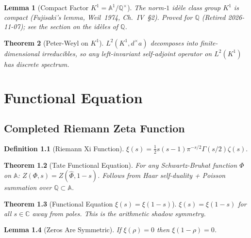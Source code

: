 \documentclass{report}
\newtheorem{theorem}{Theorem}[chapter]
\newtheorem{lemma}[theorem]{Lemma}
\theoremstyle{definition}
\newtheorem{definition}[theorem]{Definition}
\begin{document}
\begin{lemma}[Compact Factor $K^1 = \mathbb{A}^1/\mathbb{Q}^\times$]
  \label{lem:fujisaki}
  \leanok
  The norm-$1$ id\`ele class group $K^1$ is compact
  (Fujisaki's lemma, Weil~1974, Ch.~IV~\S2). Proved for $\mathbb Q$ (Retired 2026-11-07); see the section on the id\`eles of $\mathbb Q$.
\end{lemma}

\begin{theorem}[Peter-Weyl on $K^1$]
  \label{thm:peter-weyl-adelic}
  $L^2(K^1, d^\times a)$ decomposes into finite-dimensional irreducibles,
  so any left-invariant self-adjoint operator on $L^2(K^1)$ has discrete spectrum.
\end{theorem}

\chapter{Functional Equation}

\section{Completed Riemann Zeta Function}

\begin{definition}[Riemann Xi Function]
  \label{def:xi}
  \leanok
  $\xi(s) = \tfrac{1}{2} s(s-1) \pi^{-s/2} \Gamma(s/2) \zeta(s)$.
\end{definition}

\begin{theorem}[Tate Functional Equation]
  \label{thm:tate-fe}
  For any Schwartz-Bruhat function $\Phi$ on $\mathbb{A}$:
  $Z(\Phi, s) = Z(\hat\Phi, 1-s)$.
  Follows from Haar self-duality + Poisson summation over $\mathbb{Q} \subset \mathbb{A}$.
\end{theorem}

\begin{theorem}[Functional Equation $\xi(s) = \xi(1-s)$]
  \label{thm:functional-equation}
  $\xi(s) = \xi(1-s)$ for all $s \in \mathbb{C}$ away from poles.
  This is the arithmetic shadow symmetry.
\end{theorem}

\begin{lemma}[Zeros Are Symmetric]
  \label{lem:xi-zero-symmetric}
  \leanok
  If $\xi(\rho) = 0$ then $\xi(1-\rho) = 0$.
\end{lemma}
\end{document}
